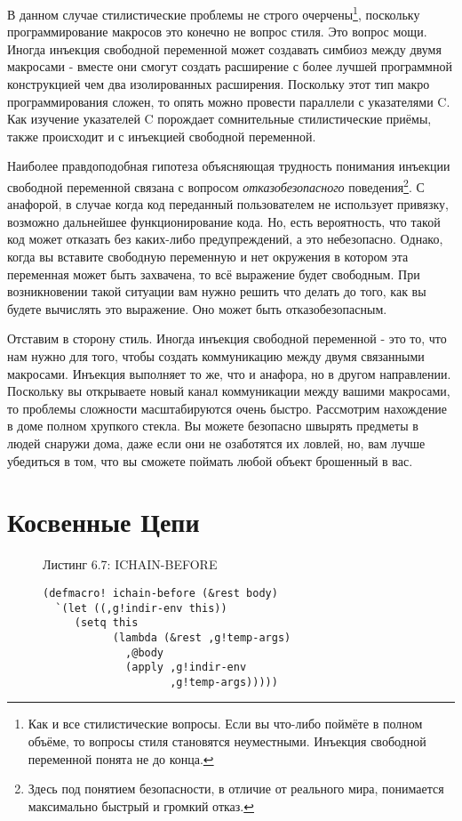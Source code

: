В данном случае стилистические проблемы не строго очерчены\footnote{Как и все стилистические вопросы. Если вы что-либо поймёте в полном объёме, то вопросы стиля становятся неуместными. Инъекция свободной переменной понята не до конца.}, поскольку программирование макросов это конечно не вопрос стиля. Это вопрос мощи. Иногда инъекция свободной переменной может создавать симбиоз между двумя макросами - вместе они смогут создать расширение с более лучшей программной конструкцией чем два изолированных расширения. Поскольку этот тип макро программирования сложен, то опять можно провести параллели с указателями C. Как изучение указателей C порождает сомнительные стилистические приёмы, также происходит и с инъекцией свободной переменной.



Наиболее правдоподобная гипотеза объясняющая трудность понимания инъекции свободной переменной связана с вопросом \emph{отказобезопасного} поведения\footnote{Здесь под понятием безопасности, в отличие от реального мира, понимается максимально быстрый и громкий отказ.}. С анафорой, в случае когда код переданный пользователем не использует привязку, возможно дальнейшее функционирование кода. Но, есть вероятность, что такой код может отказать без каких-либо предупреждений, а это небезопасно. Однако, когда вы вставите свободную переменную и нет окружения в котором эта переменная может быть захвачена, то всё выражение будет свободным. При возникновении такой ситуации вам нужно решить что делать до того, как вы будете вычислять это выражение. Оно может быть отказобезопасным.

Отставим в сторону стиль. Иногда инъекция свободной переменной - это то, что нам нужно для того, чтобы создать коммуникацию между двумя связанными макросами. Инъекция выполняет то же, что и анафора, но в другом направлении. Поскольку вы открываете новый канал коммуникации между вашими макросами, то проблемы сложности масштабируются очень быстро. Рассмотрим нахождение в доме полном хрупкого стекла. Вы можете безопасно швырять предметы в людей снаружи дома, даже если они не озаботятся их ловлей, но, вам лучше убедиться в том, что вы сможете поймать любой объект брошенный в вас.

\section{Косвенные Цепи}\label{section_indirection_chains}



\begin{figure}Листинг 6.7: ICHAIN-BEFORE\label{listing_6.7}
\listbegin
\begin{verbatim}
(defmacro! ichain-before (&rest body)
  `(let ((,g!indir-env this))
     (setq this
           (lambda (&rest ,g!temp-args)
             ,@body
             (apply ,g!indir-env
                    ,g!temp-args)))))
\end{verbatim}
\listend
\end{figure}


